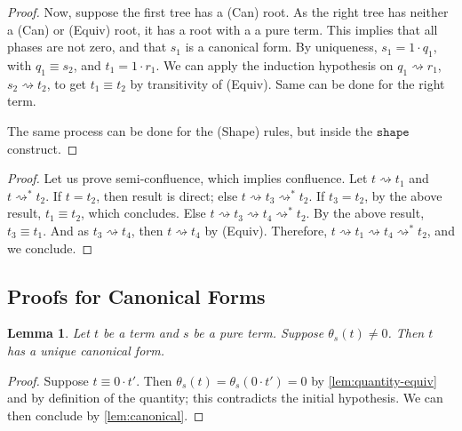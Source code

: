 \documentclass[10pt,a4paper]{article}
\newcommand{\textshape}{\ensuremath{\mathtt{shape}}}
\newcommand{\reduces}{\rightsquigarrow}
\newcommand{\sreduces}{\reduces^*}
\newcommand{\qt}[2]{\theta_{#1}(#2)}
\newtheorem{lemma}[theorem]{Lemma}
\begin{document}
\begin{proof}
  Now, suppose the first tree has a (Can) root. As the right tree has neither a
  (Can) or (Equiv) root, it has a root with a a pure term. This implies that
  all phases are not zero, and that $s_1$ is a canonical form. By uniqueness,
  $s_1 = 1 \cdot q_1$, with $q_1 \equiv s_2$, and $t_1 = 1 \cdot r_1$.
  We can apply the induction hypothesis on $q_1 \reduces r_1$,
  $s_2 \reduces t_2$, to get $t_1 \equiv t_2$ by transitivity of (Equiv).
  Same can be done for the right term.

  The same process can be done for the (Shape) rules, but inside the
  \textshape{} construct. \qedhere
\end{proof}

\confluence*

\begin{proof}
  Let us prove semi-confluence, which implies confluence.
  Let $t \reduces t_1$ and $t \sreduces t_2$.
  If $t = t_2$, then result is direct; else $t \reduces t_3 \sreduces t_2$.
  If $t_3 = t_2$, by the above result, $t_1 \equiv t_2$, which concludes.
  Else $t \reduces t_3 \reduces t_4 \sreduces t_2$.
  By the above result, $t_3 \equiv t_1$.
  And as $t_3 \reduces t_4$, then $t \reduces t_4$ by (Equiv).
  Therefore, $t \reduces t_1 \reduces t_4 \sreduces t_2$, and we
  conclude. \qedhere
\end{proof}

\subsection{Proofs for Canonical Forms}

\begin{lemma}\label{lem:quantity-nonzero}
  Let $t$ be a term and $s$ be a pure term.
  Suppose $\qt s t \neq 0$.
  Then $t$ has a unique canonical form.
\end{lemma}

\begin{proof}
  Suppose $t \equiv 0 \cdot t'$.
  Then $\qt s t = \qt s {0 \cdot t'} = 0$ by
  \autoref{lem:quantity-equiv} and by definition of
  the quantity; this contradicts the initial
  hypothesis. We can then conclude by \autoref{lem:canonical}. \qedhere
\end{proof}

\canonicaltyped*
\end{document}
